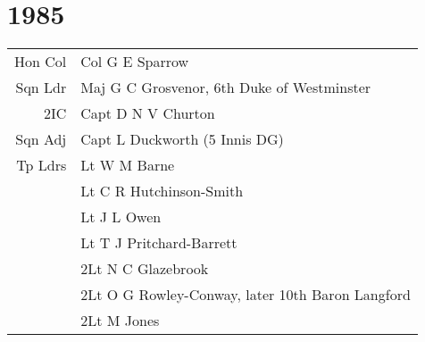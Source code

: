 \chapter*{1985}

\begin{center}
  \small
  \begin{tabular}{rl}
    Hon Col & Col G E Sparrow \\
    Sqn Ldr & Maj G C Grosvenor, 6th Duke of Westminster \\
    2IC & Capt D N V Churton \\
    Sqn Adj & Capt L Duckworth (5 Innis DG) \\
    Tp Ldrs & Lt W M Barne \\
      & Lt C R Hutchinson-Smith \\
      & Lt J L Owen \\
      & Lt T J Pritchard-Barrett \\
      & 2Lt N C Glazebrook \\
      & 2Lt O G Rowley-Conway, later 10th Baron Langford \\
      & 2Lt M Jones \\
  \end{tabular}
\end{center}

